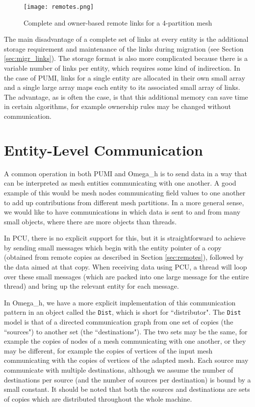 \begin{figure}[t]\vspace*{4pt}
\centerline{\texttt{[image: remotes.png]}}
\caption{Complete and owner-based remote links for a
4-partition mesh}\vspace*{-6pt}
\label{fig:remotes}
\end{figure}

The main disadvantage of a complete set of links at every entity
is the additional storage requirement and maintenance of the links
during migration (see Section \ref{sec:migr_links}).
The storage format is also more complicated because there is a variable
number of links per entity, which requires some kind of indirection.
In the case of PUMI, links for a single entity are allocated in their
own small array and a single large array maps each entity to its associated
small array of links.
The advantage, as is often the case, is that this additional memory
can save time in certain algorithms,
for example ownership rules may be changed without communication.

\section{Entity-Level Communication}
\label{sec:dist}

A common operation in both PUMI and Omega\_h is to send
data in a way that can be interpreted as mesh entities
communicating with one another.
A good example of this would be mesh nodes communicating
field values to one another to add up contributions from
different mesh partitions.
In a more general sense, we would like to have communications
in which data is sent to and from many small objects,
where there are more objects than threads.

In PCU, there is no explicit support for this, but it
is straightforward to achieve by sending small messages
which begin with the entity pointer of a copy (obtained from remote
copies as described in Section \ref{sec:remotes}),
followed by the data aimed at that copy.
When receiving data using PCU, a thread will loop over these
small messages (which are packed into one large message
for the entire thread) and bring up the relevant entity for each message.

In Omega\_h, we have a more explicit implementation of
this communication pattern in an object called the \texttt{Dist},
which is short for ``distributor".
The \texttt{Dist} model is that of a directed communication graph from one set of
copies (the ``sources") to another set (the ``destinations").
The two sets may be the same, for example the copies of nodes of a
mesh communicating with one another, or they may be different, for example
the copies of vertices of the input mesh communicating with
the copies of vertices of the adapted mesh.
Each source may communicate with multiple destinations, although we
assume the number of destinations per source (and the number of sources
per destination) is bound by a small constant.
It should be noted that both the sources and destinations are sets of copies which
are distributed throughout the whole machine.

